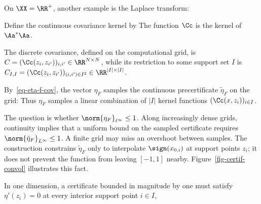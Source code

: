 On $\XX=\RR^+$, another example is the Laplace transform:

Define the continuous covariance kernel by
The function $\Cc$ is the kernel of $\Aa^* \Aa$.
 
The discrete covariance, defined on the computational grid, is $C=(\Cc(z_i,z_{i'}))_{i,i'} \in \RR^{N \times N}$, while its restriction to some support set $I$ is $C_{I,I}=(\Cc(z_i,z_{i'}))_{(i,i')\in I^2}\in\RR^{|I|\times|I|}$.

By~\eqref{eq-eta-f-cov}, the vector $\eta_F$ samples the continuous precertificate $\tilde\eta_F$ on the grid:
Thus $\eta_F$ samples a linear combination of $|I|$ kernel functions $(\Cc(x,z_i))_{i \in I}$.

The question is whether $\norm{\eta_F}_{\ell^\infty} \leq 1$. Along increasingly dense grids, continuity implies that a uniform bound on the sampled certificate requires $\norm{\tilde\eta_F}_{L^\infty}\leq1$. A finite grid may miss an overshoot between samples. The construction constrains $\tilde\eta_F$ only to interpolate $\sign(x_{0,i})$ at support points $z_i$; it does not prevent the function from leaving $[-1,1]$ nearby. Figure~\ref{fig-certif-convol} illustrates this fact.


In one dimension, a certificate bounded in magnitude by one must satisfy $\eta'(z_i)=0$ at every interior support point $i \in I$, 
